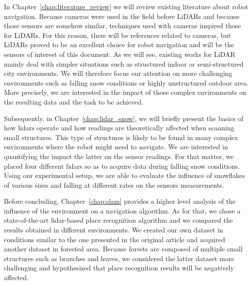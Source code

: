 In Chapter~\ref{chap:literature_review} we will review existing literature about robot navigation. Because cameras were used in the field before LiDARs and because those sensors are somehow similar, techniques used with cameras inspired those for LiDARs. For this reason, there will be references related to cameras, but LiDARs proved to be an excellent choice for robot navigation and will be the sensors of interest of this document. As we will see, existing works for LiDAR mainly deal with simpler situations such as structured indoor or semi-structured city environments. We will therefore focus our attention on more challenging environments such as falling snow conditions or highly unstructured outdoor area. More precisely, we are interested in the impact of those complex environments on the resulting data and the task to be achieved.

Subsequently, in Chapter~\ref{chap:lidar_snow}, we will briefly present the basics of how \gls*{lidar}s operate and how readings are theoretically affected when scanning small structures. This type of structures is likely to be found in many complex environments where the robot might need to navigate. We are interested in quantifying the impact the latter on the sensor readings. For that matter, we placed four different \gls*{lidar}s so as to acquire data during falling snow conditions. Using our experimental setup, we are able to evaluate the influence of snowflakes of various sizes and falling at different rates on the sensors measurements. 

Before concluding, Chapter~\ref{chap:slam} provides a higher level analysis of the influence of the environment on a navigation algorithm. As for that, we chose a state-of-the-art \gls*{lidar}-based place recognition algorithm and we compared the results obtained in different environments. We created our own dataset in conditions similar to the one presented in the original article and acquired another dataset in forested area. Because forests are composed of multiple small structures such as branches and leaves, we considered the latter dataset more challenging and hypothesized that place recognition results will be negatively affected.
